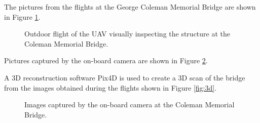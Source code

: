 \documentclass[12pt]{report}
\begin{document}
The pictures from the flights at the George Coleman Memorial Bridge are shown in Figure \ref{fig:outdoor_flight_2}.


\begin{figure}[htp]
	\centering 
	\caption{Outdoor flight of the UAV visually inspecting the structure at the Coleman Memorial Bridge.}
   \label{fig:outdoor_flight_2}
\end{figure}

Pictures captured by the on-board camera are shown in Figure \ref{fig:cam_pics_2}. 

A 3D reconstruction software Pix4D \cite{pix4d} is used to create a 3D scan of the bridge from the images obtained during the flights shown in Figure \ref{fig:3d}.  

\begin{figure}[htp]
	\centering 
	\caption{Images captured by the on-board camera at the Coleman Memorial Bridge.}
   \label{fig:cam_pics_2}
\end{figure}
\end{document}
